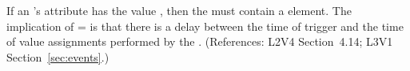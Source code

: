 If an \Event's  attribute has the value
, then the \Event must contain a \Delay element.  The
implication of = is that there
is a delay between the time of trigger and the time of value assignments
performed by the \Event.  (References: L2V4 Section~4.14; L3V1 Section~\ref{sec:events}.)

